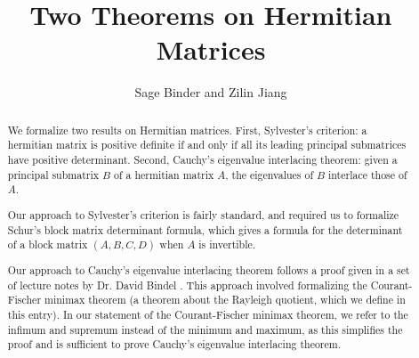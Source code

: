 \documentclass[11pt,a4paper]{article}
\begin{document}
\title{Two Theorems on Hermitian Matrices}
\author{Sage Binder and Zilin Jiang}
\maketitle

\begin{abstract}
    We formalize two results on Hermitian matrices.
    First, Sylvester's criterion: a hermitian matrix
    is positive definite if and only if all its leading principal submatrices
    have positive determinant.
    Second, Cauchy's eigenvalue interlacing theorem:
    given a principal submatrix $B$ of a hermitian matrix $A$,
    the eigenvalues of $B$ interlace those of $A$.

    Our approach to Sylvester's criterion is fairly standard,
    and required us to formalize Schur's block matrix determinant formula,
    which gives a formula for the determinant of a block matrix $(A, B, C, D)$
    when $A$ is invertible.

    Our approach to Cauchy's eigenvalue interlacing theorem
    follows a proof given in a set of lecture notes by Dr. David Bindel \cite{bindel2019lecture}.
    This approach involved formalizing the Courant-Fischer minimax theorem
    (a theorem about the Rayleigh quotient, which we define in this entry).
    In our statement of the Courant-Fischer minimax theorem,
    we refer to the infimum and supremum instead of the minimum and maximum,
    as this simplifies the proof and is sufficient to prove Cauchy's eigenvalue interlacing theorem.
\end{abstract}

\tableofcontents





\end{document}

